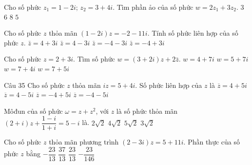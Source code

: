 \begin{ex}%
Cho số phức $z_1=1-2i$; $z_2=3+4i$. Tìm phần ảo của số phức $w=2z_1+3z_2$.
\choice
{$3$}
{$6$}
{\True $8$}
{$5$}
\end{ex}

\begin{ex}%
Cho số phức $z$ thỏa mãn $\left( 1-2i \right)z=-2-11i$. Tính số phức liên hợp của số phức $z$.
\choice
{\True $\bar{z}=4+3i$}
{ $\bar{z}=4-3i$}
{ $\bar{z}=-4-3i$}
{ $\bar{z}=-4+3i$}
\end{ex}

\begin{ex}%

Cho số phức $z=2+3i$. Tìm số phức $w=\left( 3+2i \right)z+2\bar{z}$.
\choice
{\True $w=4+7i$}
{ $w=5+7i$}
{ $w=7+4i$}
{ $w=7+5i$}
\end{ex}

\begin{ex}Câu 35%
Cho số phức $z$ thỏa mãn $iz=5+4i$. Số phức liên hợp của $z$ là
\choice
{\True $\overline{z}=4+5i$}
{$\overline{z}=4-5i$}
{$\overline{z}=-4+5i$}
{$\overline{z}=-4-5i$}
\end{ex}

\begin{ex}%
Môđun của số phức $\omega=z+z^2$, với $z$ là số phức thỏa mãn $(2+i) z+\dfrac{1-i}{1+i}=5-i$ là.
\choice
{$2 \sqrt{2}$}
{$4 \sqrt{2}$}
{\True $5 \sqrt{2}$}
{$3 \sqrt{2}$}
\end{ex}

\begin{ex}%
Cho số phức $z$ thỏa mãn phương trình $(2-3i)z=5+11i$. Phần thực của số phức $z$ bằng
\choice
{\True $-\dfrac{23}{13}$}
{$\dfrac{37}{13}$}
{$\dfrac{23}{13}$}
{$-\dfrac{23}{146}$}
\end{ex}

